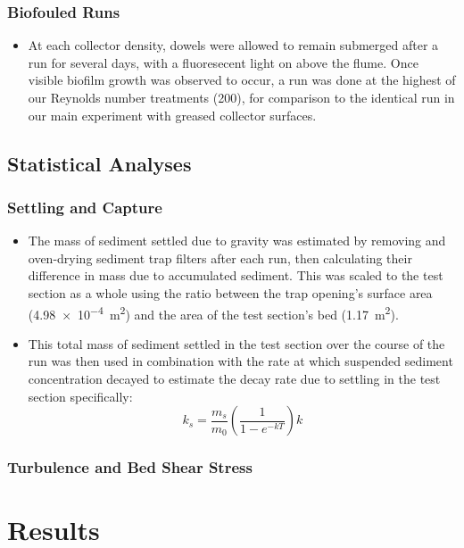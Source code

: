 \documentclass{article}
\begin{document}
\subsubsection{Biofouled Runs}

\begin{itemize}
    \item At each collector density, dowels were allowed to remain submerged after a run for several days, with a fluoresecent light on above the flume. Once visible biofilm growth was observed to occur, a run was done at the highest of our Reynolds number treatments (200), for comparison to the identical run in our main experiment with greased collector surfaces.
\end{itemize}

\subsection{Statistical Analyses}

\subsubsection{Settling and Capture}

\begin{itemize}
    \item The mass of sediment settled due to gravity was estimated by removing and oven-drying sediment trap filters after each run, then calculating their difference in mass due to accumulated sediment. This was scaled to the test section as a whole using the ratio between the trap opening's surface area (\SI{4.98e-4}{\metre^2}) and the area of the test section's bed (\SI{1.17}{\metre^2}). 
    \item This total mass of sediment settled in the test section over the course of the run was then used in combination with the rate at which suspended sediment concentration decayed to estimate the decay rate due to settling in the test section specifically:
    \begin{equation}
        k_s = \frac{m_s}{m_0}(\frac{1}{1-e^{-kT}})k
    \end{equation}
\end{itemize}

\subsubsection{Turbulence and Bed Shear Stress}

\section{Results}
\end{document}
